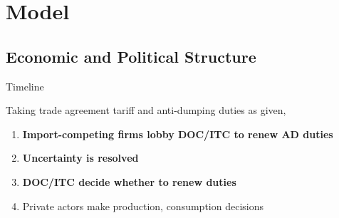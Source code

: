 \documentclass[handout]{beamer}
\begin{document}
 
\begin{comment}
\subsection{}
\begin{frame}
\frametitle{Related Literature}
\small Protection for Sale: Grossman $\&$ Helpman (1994)
\begin{itemize}
  \item \footnotesize Empirics: Goldberg $\&$ Maggi (1999), Gawande $\&$ Bandyopadhyay (2000), Mitra, Thomakos, $\&$  Ulubasoglu (2002)
  \item \footnotesize Mitra, Thomakos, $\&$  Ulubasoglu (2006), Bombardini (2008)
	\item \footnotesize Trade Wars and Trade Talks: Grossman $\&$ Helpman (1995)
\end{itemize}

\vskip.05in
\small Political economy shocks
\begin{itemize}
	\item \footnotesize Feenstra $\&$ Lewis (1991), Bagwell $\&$ Staiger (2001, 2005)
\end{itemize}

\vskip.05in
\small Separated powers
\begin{itemize}
	\item \footnotesize Mansfield, Milner $\&$ Rosendorff (2000), Song (2008)
\end{itemize}

\vskip.05in
\small Political uncertainty
\begin{itemize}
	\item \footnotesize Milner $\&$ Rosendorff (1997), Le Breton $\&$ Zaporozhets (2007) %
\end{itemize}
	
\end{frame}
\end{comment}

\section{Model}
\subsection{Economic and Political Structure}
\begin{frame}{Timeline}
\pause

Taking trade agreement tariff and anti-dumping duties as given,
\pause
\begin{enumerate}[<+->]
	\item \textbf{Import-competing firms lobby DOC/ITC to renew AD duties}
	\item \textbf{Uncertainty is resolved}
	\item \textbf{DOC/ITC decide whether to renew duties}
	\item Private actors make production, consumption decisions
\end{enumerate}
\end{frame}
\end{document}
